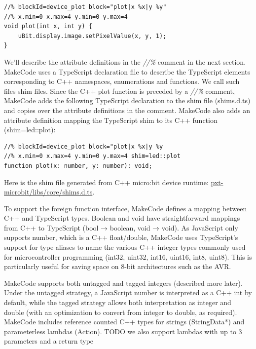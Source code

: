 \begin{lstlisting}
//% blockId=device_plot block="plot|x %x|y %y"
//% x.min=0 x.max=4 y.min=0 y.max=4
void plot(int x, int y) {
    uBit.display.image.setPixelValue(x, y, 1);
}
\end{lstlisting}

We'll describe the attribute definitions in the \emph{//\%} comment in the next section. 
MakeCode uses a  TypeScript declaration file to describe the TypeScript elements corresponding
to C++ namespaces, enumerations and functions.  We call such files shim files.
Since the C++ plot function is preceded by a \emph{//\%} comment, 
MakeCode adds the following TypeScript declaration to the shim file (shims.d.ts) and copies
over the attribute definitions in the comment. MakeCode also adds an attribute definition mapping
the TypeScript shim to its C++ function (shim=led::plot):

\begin{lstlisting}
//% blockId=device_plot block="plot|x %x|y %y
//% x.min=0 x.max=4 y.min=0 y.max=4 shim=led::plot
function plot(x: number, y: number): void;
\end{lstlisting}

Here is the shim file generated from C++ micro:bit device runtime:
\href{https://github.com/Microsoft/pxt-microbit/blob/master/libs/core/shims.d.ts}{pxt-microbit/libs/core/shims.d.ts}.

To support the foreign function interface, MakeCode defines a mapping between C++ and TypeScript types.
Boolean and void have straightforward mappings from C++ to TypeScript (bool → boolean, void → void). 
As JavaScript only supports number, which is a C++ float/double, MakeCode uses TypeScript's support
for type aliases to name the various C++ integer types commonly used for microcontroller programming
(int32, uint32, int16, uint16, int8, uint8). 
This is particularly useful for saving space on 8-bit architectures such as the AVR. 

MakeCode supports both untagged and tagged integers (described more later).  Under the untagged strategy,
a JavaScript number is interpreted as a C++ int by default, while the tagged strategy allows both
interpretation as integer and double (with an optimization to convert from integer to double, as required).  
MakeCode includes reference counted C++ types for strings (StringData*) and parameterless lambdas (Action).
TODO we also support lambdas with up to 3 parameters and a return type

